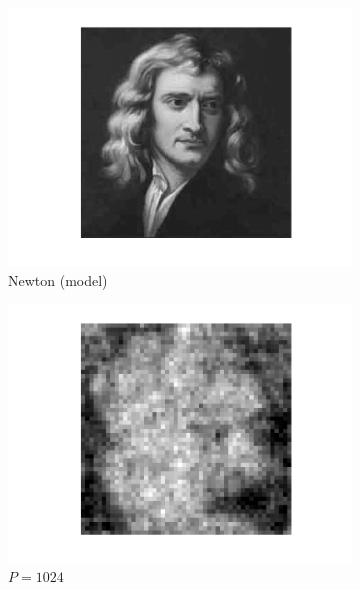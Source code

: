 \documentclass[english,11pt]{article}
\newcommand{\1}{\mathbf{1}}
\numberwithin{equation}{section}
\theoremstyle{plain}
\theoremstyle{definition}
\theoremstyle{remark}
\theoremstyle{plain}
\theoremstyle{remark}
\theoremstyle{plain}
\theoremstyle{plain}
\begin{document}
\begin{figure}[h!]
	\centering
	\begin{subfigure}[h]{0.25\textwidth}
		\centering
		\includegraphics[scale=0.3]{Newton}
		\caption{\label{fig:newton}Newton  (model)}
	\end{subfigure}%
	\begin{subfigure}[h]{0.25\textwidth}
		\centering
		\includegraphics[scale=0.3]{reconstruction2}
		\caption{\small $P =1024$}
	\end{subfigure}%
	\begin{subfigure}[h]{0.25\textwidth}
		\centering

\end{subfigure}
\end{figure}
\end{document}
